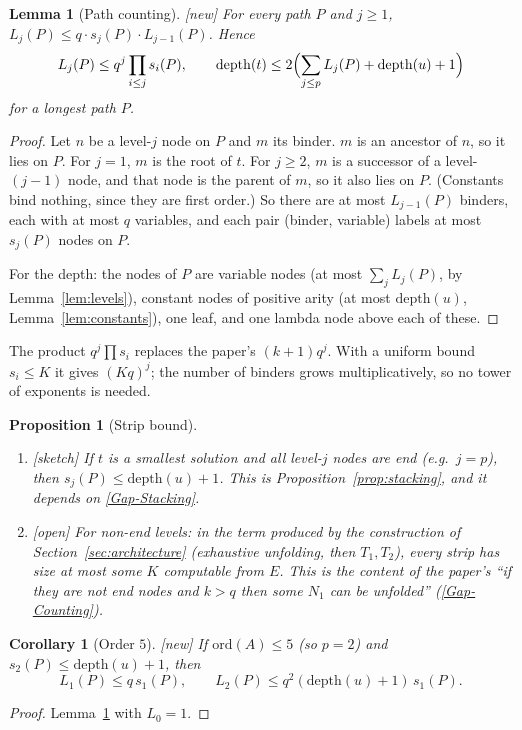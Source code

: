 \documentclass[11pt]{article}
\newcommand{\ord}{\mathrm{ord}}
\newcommand{\depth}{\mathrm{depth}}
\newcommand{\New}{\textsf{[new]}}
\newcommand{\Sketch}{\textsf{[sketch]}}
\newcommand{\Open}{\textsf{\color{red!60!black}[open]}}
\theoremstyle{plain}
\newtheorem{proposition}[theorem]{Proposition}
\newtheorem{lemma}[theorem]{Lemma}
\newtheorem{corollary}[theorem]{Corollary}
\theoremstyle{definition}
\theoremstyle{remark}
\newcommand{\GapStacking}{\hyperref[gap:stacking]{[Gap-Stacking]}}
\newcommand{\GapCounting}{\hyperref[gap:count]{[Gap-Counting]}}
\begin{document}
\begin{lemma}[Path counting]\label{lem:pathcount}
\New{} For every path $P$ and $j\ge1$, $L_j(P)\le q\cdot s_j(P)\cdot
L_{j-1}(P)$.  Hence
\[
L_j(P)\le q^j\prod_{i\le j}s_i(P),
\qquad
\depth(t)\le 2\Bigl(\sum_{j\le p}L_j(P)+\depth(u)+1\Bigr)
\]
for a longest path $P$.
\end{lemma}
\begin{proof}
Let $n$ be a level-$j$ node on $P$ and $m$ its binder.  $m$ is an
ancestor of $n$, so it lies on $P$.  For $j=1$, $m$ is the root of $t$.
For $j\ge2$, $m$ is a successor of a level-$(j-1)$ node, and that node
is the parent of $m$, so it also lies on $P$.  (Constants bind nothing,
since they are first order.)  So there are at most $L_{j-1}(P)$
binders, each with at most $q$ variables, and each pair (binder,
variable) labels at most $s_j(P)$ nodes on $P$.

For the depth: the nodes of $P$ are variable nodes (at most
$\sum_jL_j(P)$, by Lemma~\ref{lem:levels}), constant nodes of positive
arity (at most $\depth(u)$, Lemma~\ref{lem:constants}), one leaf, and
one lambda node above each of these.
\end{proof}

The product $q^j\prod s_i$ replaces the paper's $(k+1)q^j$.  With a
uniform bound $s_i\le K$ it gives $(Kq)^j$; the number of binders
grows multiplicatively, so no tower of exponents is needed.

\begin{proposition}[Strip bound]\label{prop:stripbound}
\begin{enumerate}
\item \Sketch{} If $t$ is a smallest solution and all level-$j$ nodes
  are end (e.g.\ $j=p$), then $s_j(P)\le\depth(u)+1$.  This is Proposition~\ref{prop:stacking},
  and it depends on \GapStacking{}.
\item \Open{} For non-end levels: in the term produced by the
  construction of Section~\ref{sec:architecture} (exhaustive unfolding,
  then $T_1,T_2$), every strip has size at most some $K$ computable from
  $E$.  This is the content of the paper's ``if they are not end nodes
  and $k>q$ then some $N_1$ can be unfolded'' (\GapCounting{}).
\end{enumerate}
\end{proposition}

\begin{corollary}[Order $5$]\label{cor:order5count}
\New{} If $\ord(A)\le5$ (so $p=2$) and $s_2(P)\le\depth(u)+1$, then
\[
L_1(P)\le q\,s_1(P),\qquad L_2(P)\le q^2(\depth(u)+1)\,s_1(P).
\]
\end{corollary}
\begin{proof}
Lemma~\ref{lem:pathcount} with $L_0=1$.
\end{proof}
\end{document}
